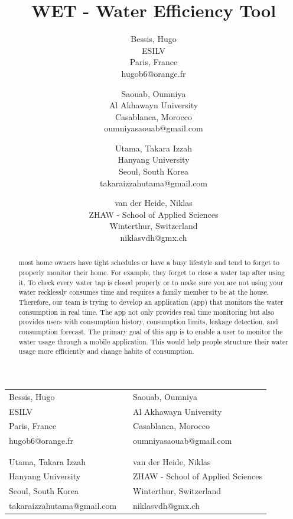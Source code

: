 \documentclass[10pt]{article}
\title{WET - Water Efficiency Tool }
\author{
  Bessis, Hugo\\
  ESILV\\
  Paris, France\\
  hugob6@orange.fr
  \and
  Saouab, Oumniya\\
  Al Akhawayn University\\
  Casablanca, Morocco\\
  oumniyasaouab@gmail.com
  \and
  Utama, Takara Izzah\\
  Hanyang University\\
  Seoul, South Korea\\
  takaraizzahutama@gmail.com
  \and
  van der Heide, Niklas\\
  ZHAW - School of Applied Sciences\\
  Winterthur, Switzerland\\
  niklasvdh@gmx.ch
}
\begin{document}
\maketitle

\begin{table}[H]
  \centering
  \begin{tabular}{P{5.5cm}P{1cm}P{5.5cm}}
    Bessis, Hugo & & Saouab, Oumniya \\
    ESILV & & Al Akhawayn University \\
    Paris, France & & Casablanca, Morocco \\
    hugob6@orange.fr & & oumniyasaouab@gmail.com \\
     & &  \\
     & &  \\
    Utama, Takara Izzah & & van der Heide, Niklas \\
    Hanyang University & & ZHAW - School of Applied Sciences \\
    Seoul, South Korea & & Winterthur, Switzerland \\
    takaraizzahutama@gmail.com & & niklasvdh@gmx.ch \\
  \end{tabular}
\end{table}

\vspace{1cm}

\begin{abstract}
most home owners have tight schedules or have a busy lifestyle and tend to forget to properly monitor their home. For example, they forget to close a water tap after using it. To check every water tap is closed properly or to make sure you are not using your water recklessly consumes time and requires a family member to be at the house. Therefore, our team is trying to develop an application (app) that monitors the water consumption in real time. The app not only provides real time monitoring but also provides users with consumption history, consumption limits, leakage detection, and consumption forecast. The primary goal of this app is to enable a user to monitor the water usage through a mobile application. This would help people structure their water usage more efficiently and change habits of consumption.
\end{abstract}

\clearpage
\end{document}
